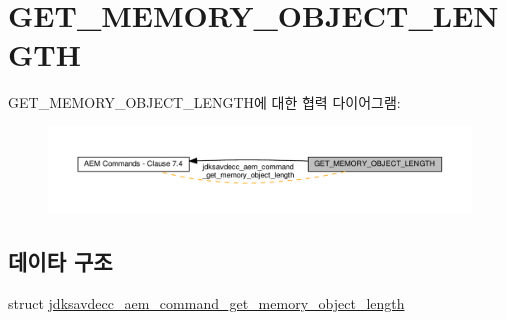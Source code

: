 \hypertarget{group__command__get__memory__object__length}{}\section{G\+E\+T\+\_\+\+M\+E\+M\+O\+R\+Y\+\_\+\+O\+B\+J\+E\+C\+T\+\_\+\+L\+E\+N\+G\+TH}
\label{group__command__get__memory__object__length}
G\+E\+T\+\_\+\+M\+E\+M\+O\+R\+Y\+\_\+\+O\+B\+J\+E\+C\+T\+\_\+\+L\+E\+N\+G\+T\+H에 대한 협력 다이어그램\+:
\nopagebreak
\begin{figure}[H]
\begin{center}
\leavevmode
\includegraphics[width=350pt]{group__command__get__memory__object__length}
\end{center}
\end{figure}
\subsection*{데이타 구조}
\begin{DoxyCompactItemize}
\item 
struct \hyperlink{structjdksavdecc__aem__command__get__memory__object__length}{jdksavdecc\+\_\+aem\+\_\+command\+\_\+get\+\_\+memory\+\_\+object\+\_\+length}
\end{DoxyCompactItemize}
